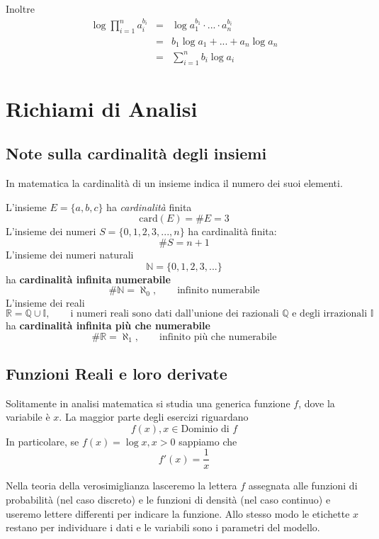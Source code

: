 \documentclass[
  11pt,
]{book}
\theoremstyle{mytheoremstyle}
\theoremstyle{mydefstyle}
\begin{document}
Inoltre
\begin{eqnarray*}
 \log\prod_{i=1}^n a_i^{b_i} &=& \log a_1^{b_1}\cdot...\cdot a_n^{b_i}\\
                       &=& b_1\log a_1 + ... + a_n\log a_n\\
                       &=& \sum_{i=1}^n b_i\log a_i
\end{eqnarray*}

\section{Richiami di Analisi}\label{richiami-di-analisi}

\subsection{Note sulla cardinalità degli insiemi}\label{note-sulla-cardinalituxe0-degli-insiemi}

In matematica la cardinalità di un insieme indica il numero dei suoi elementi.

L'insieme \(E=\{a,b,c\}\) ha \emph{cardinalità} finita \[\text{card} (E)=\# E = 3\] L'insieme dei numeri \(S=\{0,1,2,3,...,n\}\) ha cardinalità finita: \[\# S = n+1\] L'insieme dei numeri naturali \[
\mathbb{N}=\{0,1,2,3,...\}
\] ha \textbf{cardinalità infinita numerabile} \[\# \mathbb{N} = \aleph_0,\qquad \text{infinito numerabile}\] L'insieme dei reali \[\mathbb{R}=\mathbb{Q}\cup\mathbb{I}, \qquad\text{i numeri reali sono dati dall'unione dei razionali $\mathbb{Q}$ e degli irrazionali $\mathbb{I}$}\] ha \textbf{cardinalità infinita più che numerabile} \[\# \mathbb{R} = \aleph_1,\qquad \text{infinito più che numerabile}\]

\subsection{Funzioni Reali e loro derivate}\label{funzioni-reali-e-loro-derivate}

Solitamente in analisi matematica si studia una generica funzione \(f\), dove la variabile è \(x\).
La maggior parte degli esercizi riguardano
\[
f(x), x\in\text{Dominio di $f$}
\]
In particolare, se \(f(x)=\log x, x>0\) sappiamo che
\[f'(x)=\frac{1}x\]

Nella teoria della verosimiglianza lasceremo la lettera \(f\) assegnata alle funzioni di
probabilità (nel caso discreto) e le funzioni di densità (nel caso continuo) e
useremo lettere differenti per indicare la funzione. Allo stesso modo le etichette \(x\)
restano per individuare i dati e le variabili sono i parametri del modello.
\end{document}
